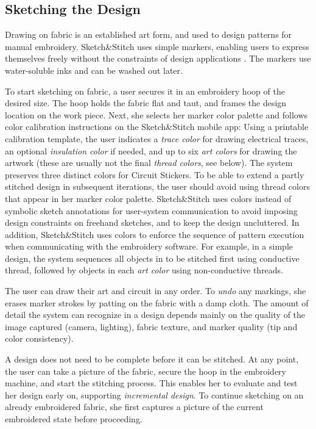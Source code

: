 \documentclass[header.tex]{subfiles}
\begin{document}
\subsection{Sketching the Design}
Drawing on fabric is an established art form, and used to design patterns for manual embroidery. 
Sketch\&Stitch uses simple markers, enabling users to express themselves freely without the constraints of design applications \cite{schweikardt2000digital,landay1995interactive}. The markers use water-soluble inks and can be washed out later.

To start sketching on fabric, a user secures it in an embroidery hoop of the desired size. The hoop holds the fabric flat and taut, and frames the design location on the work piece. Next, she selects her marker color palette and follows color calibration instructions on the Sketch\&Stitch mobile app: Using a printable calibration template, the user indicates a \textit{trace color} for drawing electrical traces, an optional \textit{insulation color} if needed, and up to six \textit{art colors} for drawing the artwork (these are usually not the final \emph{thread colors}, see below).
The system preserves three distinct colors for Circuit Stickers. To be able to extend a partly stitched design in subsequent iterations, the user should avoid using thread colors that appear in her marker color palette. Sketch\&Stitch uses colors instead of symbolic sketch annotations for user-system communication to avoid imposing design constraints on freehand sketches, and to keep the design uncluttered. In addition, Sketch\&Stitch uses colors to enforce the sequence of pattern execution when communicating with the embroidery software. For example, in a simple design, the system sequences all objects in  to be stitched first using conductive thread, followed by objects in each \textit{art color} using non-conductive threads.


 
The user can draw their art and circuit in any order.
To \textit{undo} any markings, she erases marker strokes by patting on the fabric with a damp cloth. The amount of detail the system can recognize in a design depends mainly on the quality of the image captured (camera, lighting), fabric texture, and marker quality (tip and color consistency). 

A design does not need to be complete before it can be stitched. At any point, the user can take a picture of the fabric, secure the hoop in the embroidery machine, and start the stitching process. This enables her to evaluate and test her design early on, supporting \textit{incremental design}. To continue sketching on an already embroidered fabric, she first captures a picture of the current embroidered state before proceeding.
\end{document}
